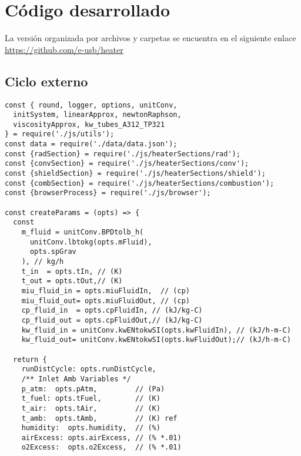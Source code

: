 \chapter{Código desarrollado}

\par La versión organizada por archivos y carpetas se encuentra en el siguiente enlace \url{https://github.com/e-usb/heater}

\section{Ciclo externo}

\begin{verbatim}
const { round, logger, options, unitConv, 
  initSystem, linearApprox, newtonRaphson, 
  viscosityApprox, kw_tubes_A312_TP321
} = require('./js/utils');
const data = require('./data/data.json');
const {radSection} = require('./js/heaterSections/rad');
const {convSection} = require('./js/heaterSections/conv');
const {shieldSection} = require('./js/heaterSections/shield');
const {combSection} = require('./js/heaterSections/combustion');
const {browserProcess} = require('./js/browser');

const createParams = (opts) => {
  const
    m_fluid = unitConv.BPDtolb_h(
      unitConv.lbtokg(opts.mFluid),
      opts.spGrav
    ), // kg/h
    t_in  = opts.tIn, // (K)
    t_out = opts.tOut,// (K)
    miu_fluid_in = opts.miuFluidIn,  // (cp)
    miu_fluid_out= opts.miuFluidOut, // (cp)
    cp_fluid_in  = opts.cpFluidIn, // (kJ/kg-C)
    cp_fluid_out = opts.cpFluidOut,// (kJ/kg-C) 
    kw_fluid_in = unitConv.kwENtokwSI(opts.kwFluidIn), // (kJ/h-m-C)
    kw_fluid_out= unitConv.kwENtokwSI(opts.kwFluidOut);// (kJ/h-m-C)

  return {
    runDistCycle: opts.runDistCycle,
    /** Inlet Amb Variables */
    p_atm:  opts.pAtm,         // (Pa) 
    t_fuel: opts.tFuel,        // (K) 
    t_air:  opts.tAir,         // (K)
    t_amb:  opts.tAmb,         // (K) ref
    humidity:  opts.humidity,  // (%) 
    airExcess: opts.airExcess, // (% *.01) 
    o2Excess:  opts.o2Excess,  // (% *.01) 
    

\end{verbatim}
